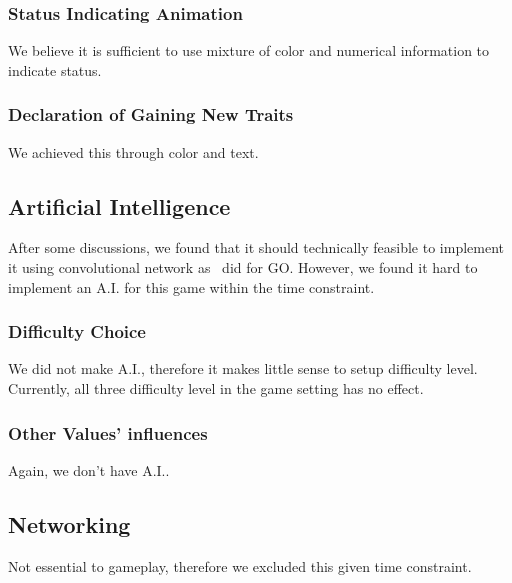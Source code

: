\subsubsection{Status Indicating Animation}
We believe it is sufficient to use mixture of color and numerical information to indicate status.

\subsubsection{Declaration of Gaining New Traits}
We achieved this through color and text.

\subsection{Artificial Intelligence}
After some discussions, we found that it should technically feasible to implement it using convolutional network as~\cite{ClarkS14} did for GO.
However, we found it hard to implement an A.I. for this game within the time constraint. 

\subsubsection{Difficulty Choice}
We did not make A.I., therefore it makes little sense to setup difficulty level. Currently, all three difficulty level in the game setting has no effect.

\subsubsection{Other Values' influences}
Again, we don't have A.I..

	\subsection{Networking}
		Not essential to gameplay, therefore we excluded this given time constraint.
	